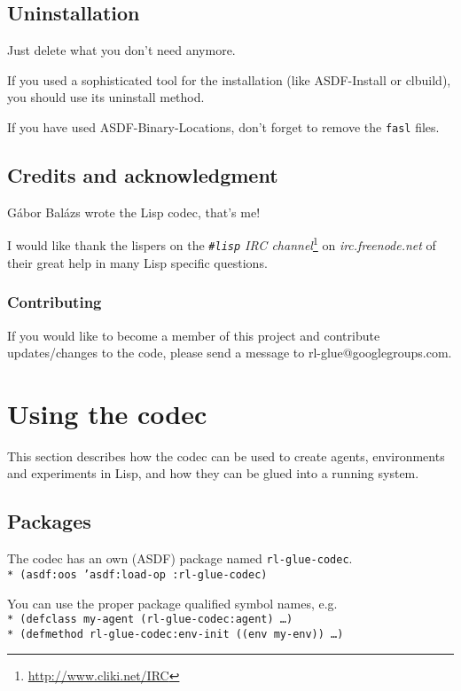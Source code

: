 \documentclass[11pt,a4paper,dvipdfm]{article}
\newcommand{\selfref}[1]{\href{#1}{#1}}
\newcommand{\footref}[2]{\textsl{#1}\footnote{\selfref{#2}}}
\newcommand{\prompttext}[1]{\texttt{#1}}
\newcommand{\lispprompt}[1]{\prompttext{* #1}}
\begin{document}
\subsection{Uninstallation}

Just delete what you don't need anymore.

If you used a sophisticated tool for the installation (like
ASDF-Install or clbuild), you should use its uninstall method.

If you have used ASDF-Binary-Locations, don't forget to remove the
\prompttext{fasl} files.

\subsection{Credits and acknowledgment}

G\'abor Bal\'azs wrote the Lisp codec, that's me!

I would like thank the lispers on the
\footref{\prompttext{\#lisp} IRC channel}{http://www.cliki.net/IRC}
on \textsl{irc.freenode.net} of their great help in many Lisp specific
questions.

\subsubsection{Contributing}

If you would like to become a member of this project and contribute 
updates/changes to the code, please send a message to rl-glue@googlegroups.com.


\section{Using the codec}
\hypertarget{usage}{}

This section describes how the codec can be used to create agents, environments
and experiments in Lisp, and how they can be glued into a running system.

\subsection{Packages}

The codec has an own (ASDF) package named \prompttext{rl-glue-codec}. \\
\lispprompt{(asdf:oos 'asdf:load-op :rl-glue-codec)}

You can use the proper package qualified symbol names, e.g. \\
\lispprompt{(defclass my-agent (rl-glue-codec:agent) \ldots)} \\
\lispprompt{(defmethod rl-glue-codec:env-init ((env my-env)) \ldots)}
\end{document}
